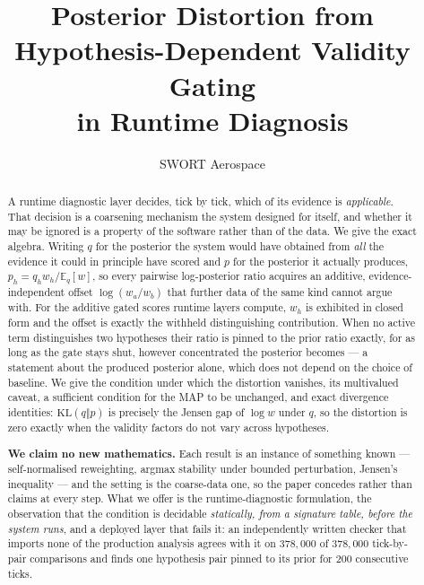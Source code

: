 \documentclass[11pt,a4paper]{article}
\title{Posterior Distortion from Hypothesis-Dependent Validity Gating\\
in Runtime Diagnosis}
\author{SWORT Aerospace}
\date{}
\theoremstyle{definition}
\begin{document}
\maketitle

\begin{abstract}
A runtime diagnostic layer decides, tick by tick, which of its evidence is
\emph{applicable}. That decision is a coarsening mechanism the system designed
for itself, and whether it may be ignored is a property of the software rather
than of the data. We give the exact algebra. Writing $q$ for the posterior the
system would have obtained from \emph{all} the evidence it could in principle
have scored and $p$ for the posterior it actually produces,
$p_h = q_h w_h / \mathbb{E}_q[w]$, so every pairwise log-posterior ratio
acquires an additive, evidence-independent offset $\log(w_a/w_b)$ that further
data of the same kind cannot argue with. For the additive gated scores runtime
layers compute, $w_h$ is exhibited in closed form and the offset is exactly the
withheld distinguishing contribution. When no active term distinguishes two
hypotheses their ratio is pinned to the prior ratio exactly, for as long as the
gate stays shut, however concentrated the posterior becomes --- a statement
about the produced posterior alone, which does not depend on the choice of
baseline.
We give the condition under which the distortion vanishes, its multivalued
caveat, a sufficient condition for the MAP to be unchanged, and exact
divergence identities:
$\mathrm{KL}(q\Vert p)$ is precisely the Jensen gap of $\log w$ under $q$, so
the distortion is zero exactly when the validity factors do not vary across
hypotheses.

\textbf{We claim no new mathematics.} Each result is an instance of something
known --- self-normalised reweighting, argmax stability under bounded
perturbation, Jensen's inequality --- and the setting is the coarse-data one,
so the paper concedes rather than claims at every step. What we
offer is the runtime-diagnostic formulation, the observation that the
condition is decidable \emph{statically, from a signature table, before the
system runs}, and a deployed layer that fails it: an independently written
checker that imports none of the production analysis agrees with it on
$378{,}000$ of $378{,}000$ tick-by-pair comparisons and finds one hypothesis
pair pinned to its prior for $200$ consecutive ticks.
\end{abstract}

\end{document}
